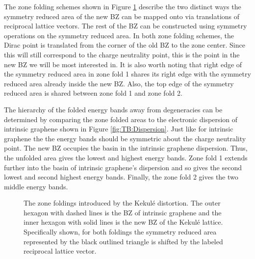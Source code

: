 The zone folding schemes shown in Figure \ref{fig:kek:folding} describe the two distinct ways the symmetry reduced area of the new BZ can be mapped onto via translations of reciprocal lattice vectors.
The rest of the BZ can be constructed using symmetry operations on the symmetry reduced area.
In both zone folding schemes, the Dirac point is translated from the corner of the old BZ to the zone center.
Since this will still correspond to the charge neutrality point, this is the point in the new BZ we will be most interested in.
It is also worth noting that right edge of the symmetry reduced area in zone fold 1 shares its right edge with the symmetry reduced area already inside the new BZ.
Also, the top edge of the symmetry reduced area is shared between zone fold 1 and zone fold 2.

The hierarchy of the folded energy bands away from degeneracies can be determined by comparing the zone folded areas to the electronic dispersion of intrinsic graphene shown in Figure \ref{fig:TB:Dispersion}.
Just like for intrinsic graphene the the energy bands should be symmetric about the charge neutrality point.
The new BZ occupies the basin in the intrinsic graphene dispersion.
Thus, the unfolded area gives the lowest and highest energy bands.
Zone fold 1 extends further into the basin of intrinsic graphene's dispersion and so gives the second lowest and second highest energy bands.
Finally, the zone fold 2 gives the two middle energy bands.

\begin{figure}
	\begin{center}
	
	\end{center}
	\caption[The zone foldings introduced by the Kekul\'e distortion]{\label{fig:kek:folding}
		The zone foldings introduced by the Kekul\'e distortion.
		The outer hexagon with dashed lines is the BZ of intrinsic graphene and the inner hexagon with solid lines is the new BZ of the Kekul\'e lattice.
		Specifically shown, for both foldings the symmetry reduced area represented by the black outlined triangle is shifted by the labeled reciprocal lattice vector.
		}
\end{figure}


